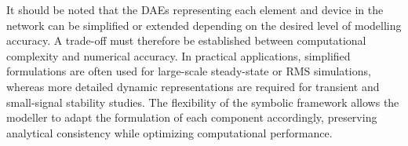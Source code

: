It should be noted that the DAEs representing each element and device in the network can be simplified or extended depending on the desired level of modelling accuracy. 
A trade-off must therefore be established between computational complexity and numerical accuracy. In practical applications, simplified formulations are often used for 
large-scale steady-state or RMS simulations, whereas more detailed dynamic representations are required for transient and small-signal stability studies. The flexibility 
of the symbolic framework allows the modeller to adapt the formulation of each component accordingly, preserving analytical consistency while optimizing computational 
performance.




\newpage